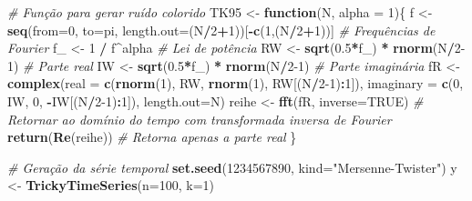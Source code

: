 \documentclass[
]{article}
\newenvironment{Shaded}{\begin{snugshade}}{\end{snugshade}}
\newcommand{\AttributeTok}[1]{\textcolor[rgb]{0.13,0.29,0.53}{#1}}
\newcommand{\CommentTok}[1]{\textcolor[rgb]{0.56,0.35,0.01}{\textit{#1}}}
\newcommand{\ConstantTok}[1]{\textcolor[rgb]{0.56,0.35,0.01}{#1}}
\newcommand{\ControlFlowTok}[1]{\textcolor[rgb]{0.13,0.29,0.53}{\textbf{#1}}}
\newcommand{\DecValTok}[1]{\textcolor[rgb]{0.00,0.00,0.81}{#1}}
\newcommand{\FloatTok}[1]{\textcolor[rgb]{0.00,0.00,0.81}{#1}}
\newcommand{\FunctionTok}[1]{\textcolor[rgb]{0.13,0.29,0.53}{\textbf{#1}}}
\newcommand{\NormalTok}[1]{#1}
\newcommand{\OtherTok}[1]{\textcolor[rgb]{0.56,0.35,0.01}{#1}}
\newcommand{\SpecialCharTok}[1]{\textcolor[rgb]{0.81,0.36,0.00}{\textbf{#1}}}
\newcommand{\StringTok}[1]{\textcolor[rgb]{0.31,0.60,0.02}{#1}}
\begin{document}
\begin{Shaded}
\begin{Highlighting}[]
\CommentTok{\# Função para gerar ruído colorido}
\NormalTok{TK95 }\OtherTok{\textless{}{-}} \ControlFlowTok{function}\NormalTok{(N, }\AttributeTok{alpha =} \DecValTok{1}\NormalTok{)\{ }
\NormalTok{    f }\OtherTok{\textless{}{-}} \FunctionTok{seq}\NormalTok{(}\AttributeTok{from=}\DecValTok{0}\NormalTok{, }\AttributeTok{to=}\NormalTok{pi, }\AttributeTok{length.out=}\NormalTok{(N}\SpecialCharTok{/}\DecValTok{2}\SpecialCharTok{+}\DecValTok{1}\NormalTok{))[}\SpecialCharTok{{-}}\FunctionTok{c}\NormalTok{(}\DecValTok{1}\NormalTok{,(N}\SpecialCharTok{/}\DecValTok{2}\SpecialCharTok{+}\DecValTok{1}\NormalTok{))] }\CommentTok{\# Frequências de Fourier}
\NormalTok{    f\_ }\OtherTok{\textless{}{-}} \DecValTok{1} \SpecialCharTok{/}\NormalTok{ f}\SpecialCharTok{\^{}}\NormalTok{alpha }\CommentTok{\# Lei de potência}
\NormalTok{    RW }\OtherTok{\textless{}{-}} \FunctionTok{sqrt}\NormalTok{(}\FloatTok{0.5}\SpecialCharTok{*}\NormalTok{f\_) }\SpecialCharTok{*} \FunctionTok{rnorm}\NormalTok{(N}\SpecialCharTok{/}\DecValTok{2{-}1}\NormalTok{) }\CommentTok{\# Parte real}
\NormalTok{    IW }\OtherTok{\textless{}{-}} \FunctionTok{sqrt}\NormalTok{(}\FloatTok{0.5}\SpecialCharTok{*}\NormalTok{f\_) }\SpecialCharTok{*} \FunctionTok{rnorm}\NormalTok{(N}\SpecialCharTok{/}\DecValTok{2{-}1}\NormalTok{) }\CommentTok{\# Parte imaginária}
\NormalTok{    fR }\OtherTok{\textless{}{-}} \FunctionTok{complex}\NormalTok{(}\AttributeTok{real =} \FunctionTok{c}\NormalTok{(}\FunctionTok{rnorm}\NormalTok{(}\DecValTok{1}\NormalTok{), RW, }\FunctionTok{rnorm}\NormalTok{(}\DecValTok{1}\NormalTok{), RW[(N}\SpecialCharTok{/}\DecValTok{2{-}1}\NormalTok{)}\SpecialCharTok{:}\DecValTok{1}\NormalTok{]), }
                  \AttributeTok{imaginary =} \FunctionTok{c}\NormalTok{(}\DecValTok{0}\NormalTok{, IW, }\DecValTok{0}\NormalTok{, }\SpecialCharTok{{-}}\NormalTok{IW[(N}\SpecialCharTok{/}\DecValTok{2{-}1}\NormalTok{)}\SpecialCharTok{:}\DecValTok{1}\NormalTok{]), }\AttributeTok{length.out=}\NormalTok{N)}
\NormalTok{    reihe }\OtherTok{\textless{}{-}} \FunctionTok{fft}\NormalTok{(fR, }\AttributeTok{inverse=}\ConstantTok{TRUE}\NormalTok{) }\CommentTok{\# Retornar ao domínio do tempo com transformada inversa de Fourier}
    \FunctionTok{return}\NormalTok{(}\FunctionTok{Re}\NormalTok{(reihe)) }\CommentTok{\# Retorna apenas a parte real}
\NormalTok{\}}

\CommentTok{\# Geração da série temporal}
\FunctionTok{set.seed}\NormalTok{(}\DecValTok{1234567890}\NormalTok{, }\AttributeTok{kind=}\StringTok{"Mersenne{-}Twister"}\NormalTok{)}
\NormalTok{y }\OtherTok{\textless{}{-}} \FunctionTok{TrickyTimeSeries}\NormalTok{(}\AttributeTok{n=}\DecValTok{100}\NormalTok{, }\AttributeTok{k=}\DecValTok{1}\NormalTok{)}


\end{Highlighting}
\end{Shaded}
\end{document}
